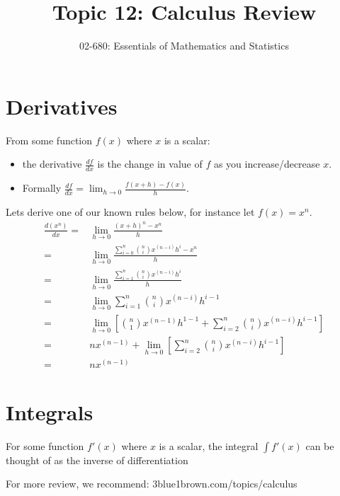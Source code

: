 


\title{Topic 12: Calculus Review}
\author{02-680: Essentials of Mathematics and Statistics}


\maketitle

\section{Derivatives}
 From some function $f(x)$ where $x$ is a scalar:
 \begin{itemize}
 \item the derivative $\displaystyle\frac{df}{dx}$ is the change in value of $f$ as you increase/decrease $x$.
 \item Formally $\displaystyle\frac{df}{dx}=\lim_{h\rightarrow 0}\frac{f\left(x+h\right) - f(x)}{h}$.
 \end{itemize}
 
 Lets derive one of our known rules below, for instance let $f(x)=x^n$. 
 \begin{align}
 \frac{d(x^n)}{dx}=&\lim_{h\rightarrow 0}\frac{(x+h)^n - x^n}{h}\\
 =& \lim_{h\rightarrow 0}\frac{\sum_{i=0}^n {n \choose i} x^{(n-i)}h^i - x^n}{h}\\
 =& \lim_{h\rightarrow 0}\frac{\sum_{i=1}^{n} {n \choose i} x^{(n-i)}h^i}{h}\\
 =& \lim_{h\rightarrow 0}\sum_{i=1}^{n} {n \choose i} x^{(n-i)}h^{i-1}\\
 =& \lim_{h\rightarrow 0} \left[{n \choose 1}x^{(n-1)}h^{1-1} + \sum_{i=2}^{n} {n \choose i} x^{(n-i)}h^{i-1}\right]\\
 =& nx^{(n-1)} + \lim_{h\rightarrow 0} \left[\sum_{i=2}^{n} {n \choose i} x^{(n-i)}h^{i-1}\right]\\
 =& nx^{(n-1)}
 \end{align}
 

\section{Integrals}
For some function $f'(x)$ where $x$ is a scalar, 
the integral $\displaystyle\int f'(x)$ can be thought of as the inverse of differentiation

For more review, we recommend: 3blue1brown.com/topics/calculus


